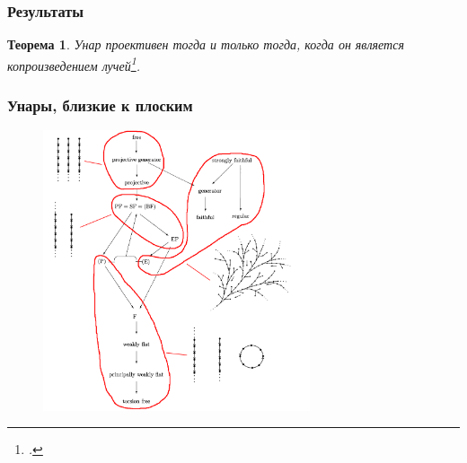 \documentclass[11pt, notheorems]{beamer}
\newtheorem{theorem}{Теорема}
\begin{document}
\begin{frame}
	\frametitle{Результаты}

	\begin{theorem}
		Унар проективен тогда и только тогда, когда он является копроизведением лучей\footcite[теорема 1]{sahar}.
	\end{theorem}
\end{frame}

\begin{frame}
	\frametitle{Унары, близкие к плоским}

	\begin{figure}
		\center
		\includegraphics[width=0.7\textwidth]{overview_6.png}
	\end{figure}
\end{frame}
\end{document}
